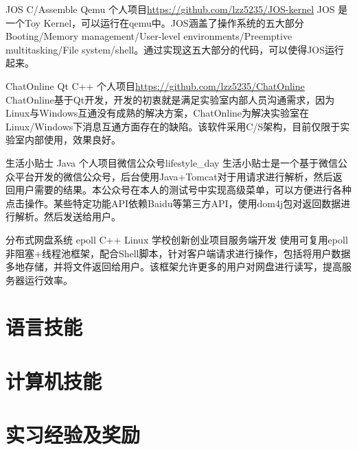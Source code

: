 \documentclass[11pt,a4paper]{moderncv}
\begin{document}
{JOS}
{C/Assemble Qemu}
{个人项目}{\url{https://github.com/lzz5235/JOS-kernel}}
{JOS 是一个Toy Kernel，可以运行在qemu中。JOS涵盖了操作系统的五大部分Booting/Memory management/User-level environments/Preemptive multitasking/File system/shell。通过实现这五大部分的代码，可以使得JOS运行起来。}

{ChatOnline}
{Qt C++}
{个人项目}{\url{https://github.com/lzz5235/ChatOnline}}
{ChatOnline基于Qt开发，开发的初衷就是满足实验室内部人员沟通需求，因为Linux与Windows互通没有成熟的解决方案，ChatOnline为解决实验室在Linux/Windows下消息互通方面存在的缺陷。该软件采用C/S架构，目前仅限于实验室内部使用，效果良好。}

{生活小贴士}
{Java}
{个人项目}{微信公众号lifestyle\_day}
{生活小贴士是一个基于微信公众平台开发的微信公众号，后台使用Java+Tomcat对于用请求进行解析，然后返回用户需要的结果。本公众号在本人的测试号中实现高级菜单，可以方便进行各种点击操作。某些特定功能API依赖Baidu等第三方API，使用dom4j包对返回数据进行解析。然后发送给用户。}

{分布式网盘系统}
{epoll C++ Linux}
{学校创新创业项目}{服务端开发}
{使用可复用epoll非阻塞+线程池框架，配合Shell脚本，针对客户端请求进行操作，包括将用户数据多地存储，并将文件返回给用户。该框架允许更多的用户对网盘进行读写，提高服务器运行效率。}

\section{语言技能}

\section{计算机技能}


\section{实习经验及奖励}
\end{document}
